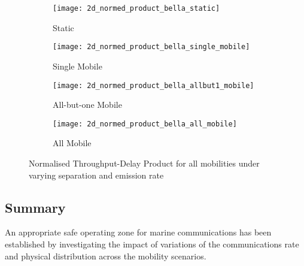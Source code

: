 \begin{figure}[h]
	\begin{subfigure}[t]{0.5\textwidth}
		\centering
		\texttt{[image: 2d\_normed\_product\_bella\_static]}
		\caption{Static}
		\label{fig:2d_normed_product_bella_static}
	\end{subfigure}
	\begin{subfigure}[t]{0.5\textwidth}
		\centering
		\texttt{[image: 2d\_normed\_product\_bella\_single\_mobile]}
		\caption{Single Mobile}
		\label{fig:2d_normed_product_bella_single_mobile}
	\end{subfigure}
	
	\begin{subfigure}[t]{0.5\textwidth}
		\centering
		\texttt{[image: 2d\_normed\_product\_bella\_allbut1\_mobile]}
		\caption{All-but-one Mobile}
		\label{fig:2d_normed_product_bella_allbut1_mobile}
	\end{subfigure}
	\begin{subfigure}[t]{0.5\textwidth}
		\centering
		\texttt{[image: 2d\_normed\_product\_bella\_all\_mobile]}
		\caption{All Mobile}
		\label{fig:2d_normed_product_bella_all_mobile}
	\end{subfigure}
	\caption{Normalised Throughput-Delay Product for all mobilities under varying separation and emission rate}
	\label{fig:2d_normed_product}
\end{figure}


\subsection{Summary}

An appropriate safe operating zone for marine communications has been established by investigating the impact of variations of the communications rate and physical distribution across the mobility scenarios.

